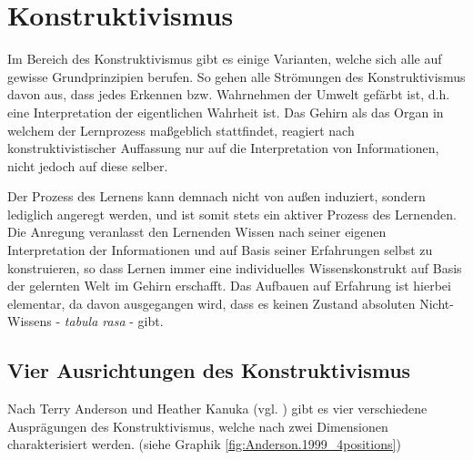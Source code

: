 \chapter{Konstruktivismus}
\label{cha:Konstruktivismus}
Im Bereich des Konstruktivismus gibt es einige Varianten, welche sich alle auf gewisse Grundprinzipien berufen. So gehen alle Strömungen des Konstruktivismus davon aus, dass jedes Erkennen bzw. Wahrnehmen der Umwelt gefärbt ist, d.h. eine Interpretation der eigentlichen Wahrheit ist. Das Gehirn als das Organ in welchem der Lernprozess maßgeblich stattfindet, reagiert nach konstruktivistischer Auffassung nur auf die Interpretation von Informationen, nicht jedoch auf diese selber. \cite{Reinmann.2013} %

Der Prozess des Lernens kann demnach nicht von außen induziert, sondern lediglich angeregt werden, und ist somit stets ein aktiver Prozess des Lernenden.  \cite{Reinmann.2013} %
Die Anregung veranlasst den Lernenden Wissen nach seiner eigenen Interpretation der Informationen und auf Basis seiner Erfahrungen selbst zu konstruieren, so dass Lernen immer eine individuelles Wissenskonstrukt auf Basis der gelernten Welt im Gehirn erschafft. \cite[S. 212]{Edelmann.2012} Das Aufbauen auf Erfahrung ist hierbei elementar, da davon ausgegangen wird, dass es keinen Zustand absoluten Nicht-Wissens - \emph{tabula rasa} - gibt. \cite{Anderson.1999} %

\section{Vier Ausrichtungen des Konstruktivismus}
\label{sec:Konstr_4positions}

Nach Terry Anderson und Heather Kanuka (vgl. \cite{Anderson.1999}) gibt es vier verschiedene Ausprägungen des Konstruktivismus, welche nach zwei Dimensionen charakterisiert werden. (siehe Graphik \ref{fig:Anderson.1999_4positions})

